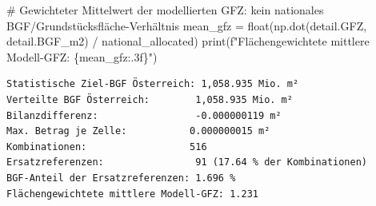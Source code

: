 \documentclass[
  ngerman,
  a4paper,
  DIV=11]{scrreprt}
\newenvironment{Shaded}{\begin{snugshade}}{\end{snugshade}}
\newcommand{\BuiltInTok}[1]{\textcolor[rgb]{0.00,0.23,0.31}{#1}}
\newcommand{\CommentTok}[1]{\textcolor[rgb]{0.37,0.37,0.37}{#1}}
\newcommand{\NormalTok}[1]{\textcolor[rgb]{0.00,0.23,0.31}{#1}}
\newcommand{\OperatorTok}[1]{\textcolor[rgb]{0.37,0.37,0.37}{#1}}
\newcommand{\SpecialCharTok}[1]{\textcolor[rgb]{0.37,0.37,0.37}{#1}}
\newcommand{\SpecialStringTok}[1]{\textcolor[rgb]{0.13,0.47,0.30}{#1}}
\begin{document}
\begin{Shaded}
\begin{Highlighting}[]
\CommentTok{\# Gewichteter Mittelwert der modellierten GFZ: kein nationales BGF/Grundstücksfläche{-}Verhältnis}
\NormalTok{mean\_gfz }\OperatorTok{=} \BuiltInTok{float}\NormalTok{(np.dot(detail.GFZ, detail.BGF\_m2) }\OperatorTok{/}\NormalTok{ national\_allocated)}
\BuiltInTok{print}\NormalTok{(}\SpecialStringTok{f"Flächengewichtete mittlere Modell{-}GFZ: }\SpecialCharTok{\{}\NormalTok{mean\_gfz}\SpecialCharTok{:.3f\}}\SpecialStringTok{"}\NormalTok{)}
\end{Highlighting}
\end{Shaded}

\begin{verbatim}
Statistische Ziel-BGF Österreich: 1,058.935 Mio. m²
Verteilte BGF Österreich:        1,058.935 Mio. m²
Bilanzdifferenz:                 -0.000000119 m²
Max. Betrag je Zelle:           0.000000015 m²
Kombinationen:                  516
Ersatzreferenzen:                91 (17.64 % der Kombinationen)
BGF-Anteil der Ersatzreferenzen: 1.696 %
Flächengewichtete mittlere Modell-GFZ: 1.231
\end{verbatim}
\end{document}
